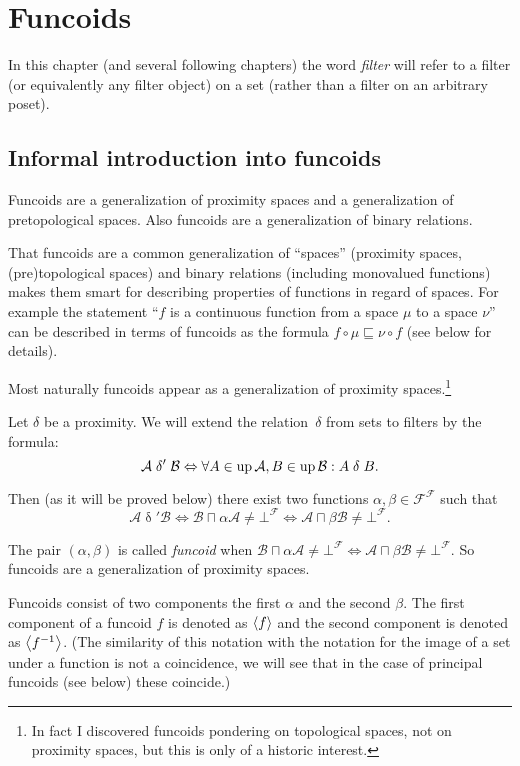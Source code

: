 
\chapter{Funcoids}

In this chapter (and several following chapters) the word \emph{filter}
will refer to a filter (or equivalently any filter object) on a set
(rather than a filter on an arbitrary poset).


\section{Informal introduction into funcoids}

Funcoids are a generalization of proximity spaces and a generalization
of pretopological spaces. Also funcoids are a generalization of binary
relations.

That funcoids are a common generalization of ``spaces'' (proximity
spaces, (pre)topological spaces) and binary relations (including monovalued
functions) makes them smart for describing properties of functions
in regard of spaces. For example the statement ``$f$ is a continuous
function from a space $\mu$ to a space $\nu$'' can be described
in terms of funcoids as the formula $f\circ\mu\sqsubseteq\nu\circ f$
(see below for details).

Most naturally funcoids appear as a generalization of proximity spaces.\footnote{In fact I discovered funcoids pondering on topological spaces, not on proximity spaces, but this is only of a historic interest.}

Let $\delta$ be a proximity. We will extend the relation~$\delta$
from sets to filters by the formula:
\[
\mathcal{A}\mathrel\delta'\mathcal{B}\Leftrightarrow\forall
A\in\operatorname{up}\mathcal{A},B\in\operatorname{up}\mathcal{B}:A\mathrel\delta B.
\]


Then (as it will be proved below) there exist two functions
$\alpha,\beta\in\mathscr{F}^{\mathscr{F}}$
such that
\[
\mathcal{A}\mathrel\delta'\mathcal{B}\Leftrightarrow\mathcal{B}
\sqcap\alpha\mathcal{A}\ne\bot^{\mathscr{F}}\Leftrightarrow\mathcal{A}
\sqcap\beta\mathcal{B}\ne\bot^{\mathscr{F}}.
\]


The pair $(\alpha,\beta)$ is called \emph{funcoid} when
$\mathcal{B}\sqcap\alpha\mathcal{A}\ne\bot^{\mathscr{F}}\Leftrightarrow\mathcal{
A}\sqcap\beta\mathcal{B}\ne\bot^{\mathscr{F}}$.
So funcoids are a generalization of proximity spaces.

Funcoids consist of two components the first $\alpha$ and the second
$\beta$. The first component of a funcoid $f$ is denoted as $\left\langle f\right\rangle$
and the second component is denoted as $\left\langle f^{-1}\right\rangle$. (The similarity
of this notation with the notation for the image of a set under a
function is not a coincidence, we will see that in the case of principal
funcoids (see below) these coincide.)

